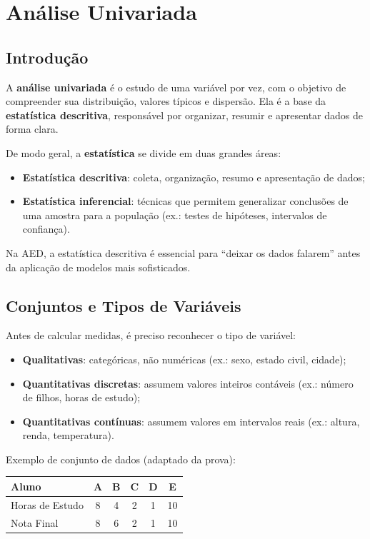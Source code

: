 \chapter{Análise Univariada}

\section{Introdução}
A \textbf{análise univariada} é o estudo de uma variável por vez, com o objetivo de compreender sua distribuição, valores típicos e dispersão.  
Ela é a base da \textbf{estatística descritiva}, responsável por organizar, resumir e apresentar dados de forma clara.  

De modo geral, a \textbf{estatística} se divide em duas grandes áreas:  
\begin{itemize}[leftmargin=*]
  \item \textbf{Estatística descritiva}: coleta, organização, resumo e apresentação de dados;  
  \item \textbf{Estatística inferencial}: técnicas que permitem generalizar conclusões de uma amostra para a população (ex.: testes de hipóteses, intervalos de confiança).  
\end{itemize}

Na AED, a estatística descritiva é essencial para “deixar os dados falarem” antes da aplicação de modelos mais sofisticados.

\section{Conjuntos e Tipos de Variáveis}
Antes de calcular medidas, é preciso reconhecer o tipo de variável:  
\begin{itemize}[leftmargin=*]
  \item \textbf{Qualitativas}: categóricas, não numéricas (ex.: sexo, estado civil, cidade);  
  \item \textbf{Quantitativas discretas}: assumem valores inteiros contáveis (ex.: número de filhos, horas de estudo);  
  \item \textbf{Quantitativas contínuas}: assumem valores em intervalos reais (ex.: altura, renda, temperatura).  
\end{itemize}

Exemplo de conjunto de dados (adaptado da prova):  

\begin{center}
\begin{tabular}{@{}lccccc@{}}\toprule
Aluno & A & B & C & D & E \\\midrule
Horas de Estudo & 8 & 4 & 2 & 1 & 10 \\
Nota Final      & 8 & 6 & 2 & 1 & 10 \\\bottomrule
\end{tabular}
\end{center}

